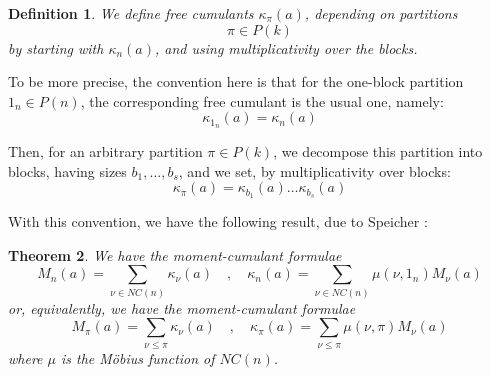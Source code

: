 \documentclass[12pt]{amsbook}
\newtheorem{theorem}{Theorem}[chapter]
\newtheorem{definition}[theorem]{Definition}
\begin{document}
\begin{definition}
We define free cumulants $\kappa_\pi(a)$, depending on partitions 
$$\pi\in P(k)$$
by starting with $\kappa_n(a)$, and using multiplicativity over the blocks. 
\end{definition}

To be more precise, the convention here is that for the one-block partition $1_n\in P(n)$, the corresponding free cumulant is the usual one, namely:
$$\kappa_{1_n}(a)=\kappa_n(a)$$

Then, for an arbitrary partition $\pi\in P(k)$, we decompose this partition into blocks, having sizes $b_1,\ldots,b_s$, and we set, by multiplicativity over blocks:
$$\kappa_\pi(a)=\kappa_{b_1}(a)\ldots\kappa_{b_s}(a)$$

With this convention, we have the following result, due to Speicher \cite{nsp}:

\begin{theorem}
We have the moment-cumulant formulae
$$M_n(a)=\sum_{\nu\in NC(n)}\kappa_\nu(a)\quad,\quad 
\kappa_n(a)=\sum_{\nu\in NC(n)}\mu(\nu,1_n)M_\nu(a)$$
or, equivalently, we have the moment-cumulant formulae
$$M_\pi(a)=\sum_{\nu\leq\pi}\kappa_\nu(a)\quad,\quad 
\kappa_\pi(a)=\sum_{\nu\leq\pi}\mu(\nu,\pi)M_\nu(a)$$
where $\mu$ is the M\"obius function of $NC(n)$.
\end{theorem}
\end{document}
